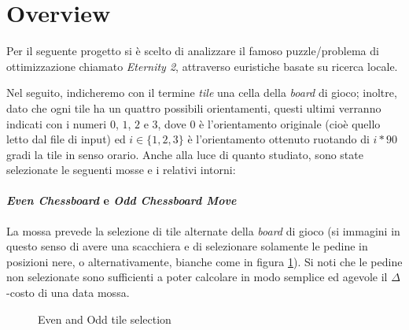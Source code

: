 \section{Overview} %
\label{sec:overview}
    
    Per il seguente progetto si è scelto di analizzare il famoso puzzle/problema di ottimizzazione chiamato \emph{Eternity 2}, attraverso euristiche basate su ricerca locale.

    Nel seguito, indicheremo con il termine \textit{tile} una cella della \textit{board} di gioco; inoltre, dato che ogni tile ha un quattro possibili orientamenti, questi ultimi verranno indicati con i numeri $0$, $1$, $2$ e $3$, dove $0$ è l'orientamento originale (cioè quello letto dal file di input) ed $i \in \{1,2,3\}$ è l'orientamento ottenuto ruotando di $i*90$ gradi la tile in senso orario. Anche alla luce di quanto studiato, sono state selezionate le seguenti mosse e i relativi intorni:

    \paragraph{\emph{Even Chessboard} e \emph{Odd Chessboard Move}} %
    \label{par:even_odd}
        
        La mossa prevede la selezione di tile alternate della \emph{board} di gioco (si immagini in questo senso di avere una scacchiera e di selezionare solamente le pedine in posizioni nere, o alternativamente, bianche come in figura \ref{fig:even_odd_chessboard}). Si noti che le pedine non selezionate sono sufficienti a poter calcolare in modo semplice ed agevole il $\Delta$-costo di una data mossa.

        \begin{figure}[H]
            \centering
            \caption{Even and Odd tile selection}
            \label{fig:even_odd_chessboard}
        \end{figure}

